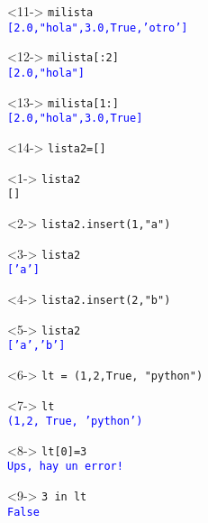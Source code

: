 \begin{frame}[fragile]
\begin{minipage}{5.5cm}
\begin{exampleblock}{}
\end{exampleblock}
\begin{exampleblock}{}<11->
	\verb|milista| \\
	\pause
	\textcolor{blue}{\texttt{[2.0,"hola",3.0,True,'otro']}}
\end{exampleblock}
\begin{exampleblock}{}<12->
	\verb|milista[:2]| \\
	\pause
	\textcolor{blue}{\texttt{[2.0,"hola"]}}
\end{exampleblock}
\begin{exampleblock}{}<13->
	\verb|milista[1:]| \\
	\pause
	\textcolor{blue}{\texttt{[2.0,"hola",3.0,True]}}
\end{exampleblock}
\begin{exampleblock}{}<14->
	\verb|lista2=[]|
\end{exampleblock}
\end{minipage}
\end{frame}
\begin{frame}[fragile]
\fontsize{12}{12}\selectfont
\begin{minipage}{5.5cm}
\begin{exampleblock}{}<1->
	\verb|lista2| \\
	\pause
	\verb|[]|
\end{exampleblock}
\begin{exampleblock}{}<2->
	\verb|lista2.insert(1,"a")|
\end{exampleblock}
\begin{exampleblock}{}<3->
	\verb|lista2| \\
	\pause
	\textcolor{blue}{\texttt{['a']}}
\end{exampleblock}
\begin{exampleblock}{}<4->
	\verb|lista2.insert(2,"b")|
\end{exampleblock}
\begin{exampleblock}{}<5->
	\verb|lista2| \\
	\pause
	\textcolor{blue}{\texttt{['a','b']}}
\end{exampleblock}
\begin{exampleblock}{}<6->
	\verb|lt = (1,2,True, "python")|
\end{exampleblock}
\end{minipage}
\hspace{0.5cm}
\begin{minipage}{5.5cm}
\begin{exampleblock}{}<7->
	\verb|lt| \\
	\pause
	\textcolor{blue}{\texttt{(1,2, True, 'python')}}
\end{exampleblock}
\begin{exampleblock}{}<8->
	\verb|lt[0]=3| \\
	\pause
	\textcolor{blue}{\texttt{Ups, hay un error!}}
\end{exampleblock}
\begin{exampleblock}{}<9->
	\verb|3 in lt| \\
	\pause
	\textcolor{blue}{\texttt{False}}
\end{exampleblock}
\end{minipage}
\end{frame}
